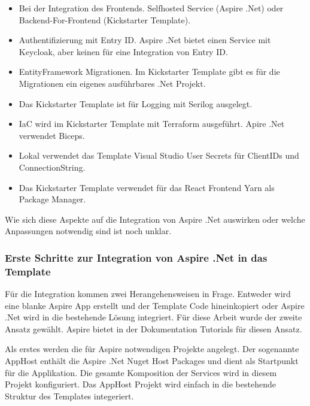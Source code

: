             \begin{itemize}
                \item Bei der Integration des Frontends. Selfhosted Service (Aspire .Net) oder Backend-For-Frontend (Kickstarter Template).
                \item Authentifizierung mit Entry ID. Aspire .Net bietet einen Service mit Keycloak, aber keinen für eine Integration von Entry ID.
                \item EntityFramework Migrationen. Im Kickstarter Template gibt es für die Migrationen ein eigenes ausführbares .Net Projekt.
                \item Das Kickstarter Template ist für Logging mit Serilog ausgelegt.
                \item IaC wird im Kickstarter Template mit Terraform ausgeführt. Apire .Net verwendet Biceps.
                \item Lokal verwendet das Template Visual Studio User Secrets für ClientIDs und ConnectionString.
                \item Das Kickstarter Template verwendet für das React Frontend Yarn als Package Manager.
            \end{itemize}

            Wie sich diese Aspekte auf die Integration von Aspire .Net auswirken oder welche Anpassungen notwendig sind ist noch unklar.

        \subsubsection{Erste Schritte zur Integration von Aspire .Net in das Template}

            Für die Integration kommen zwei Herangehensweisen in Frage. Entweder wird eine blanke Aspire App erstellt und der Template Code hineinkopiert oder Aspire .Net wird in die bestehende Lösung integriert. Für diese Arbeit wurde der zweite Ansatz gewählt. Aspire bietet in der Dokumentation Tutorials für diesen Ansatz.

            Als erstes werden die für Aspire notwendigen Projekte angelegt. Der sogenannte AppHost enthält die Aspire .Net Nuget Host Packages und dient als Startpunkt für die Applikation. Die gesamte Komposition der Services wird in diesem Projekt konfiguriert. Das AppHost Projekt wird einfach in die bestehende Struktur des Templates integeriert.
            
